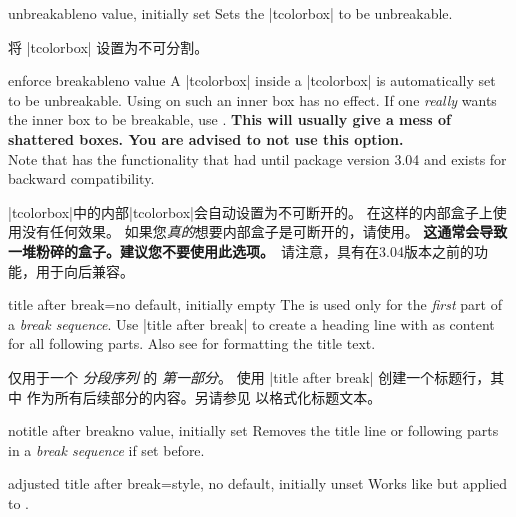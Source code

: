 \begin{docTcbKey}{unbreakable}{}{no value, initially set}
Sets the |tcolorbox| to be unbreakable.

将 |tcolorbox| 设置为不可分割。
\end{docTcbKey}


\begin{docTcbKey}{enforce breakable}{}{no value}
A |tcolorbox| inside a |tcolorbox| is automatically set to be unbreakable.
Using  on such an inner box has no effect.
If one \emph{really} wants the inner box to be breakable, use .
\textbf{This will usually give a mess of shattered boxes. You are advised to not use this option.}\\
Note that  has the functionality
that  had until package version 3.04
and exists for backward compatibility.

|tcolorbox|中的内部|tcolorbox|会自动设置为不可断开的。 在这样的内部盒子上使用没有任何效果。 如果您\emph{真的}想要内部盒子是可断开的，请使用。 \textbf{这通常会导致一堆粉碎的盒子。建议您不要使用此选项。}\ 请注意，具有在3.04版本之前的功能，用于向后兼容。
\end{docTcbKey}


\begin{docTcbKey}[][doc updated=2018-07-26]{title after break}{=}{no default, initially empty}
The  is used only for the \emph{first} part of a
\emph{break sequence}. Use |title after break| to create a heading line
with  as content for all following parts.
Also see  for formatting the title text.

 仅用于一个 \emph{分段序列} 的 \emph{第一部分}。 使用 |title after break| 创建一个标题行，其中  作为所有后续部分的内容。另请参见  以格式化标题文本。
\end{docTcbKey}


\begin{docTcbKey}{notitle after break}{}{no value, initially set}
  Removes the title line or following parts in a  \emph{break sequence} if set before.
\end{docTcbKey}


\begin{docTcbKey}{adjusted title after break}{=}{style, no default, initially unset}
  Works like  but applied to .
\end{docTcbKey}


